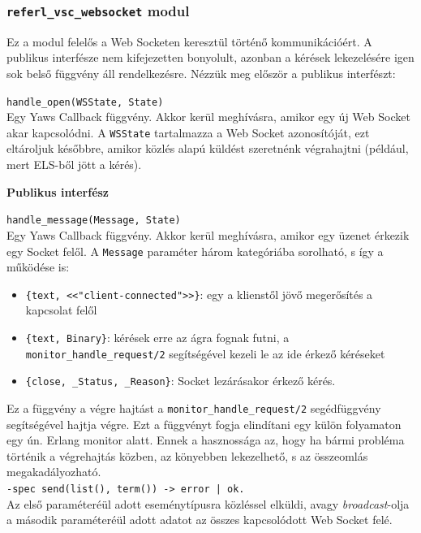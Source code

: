 \subsubsection{\lstinline{referl_vsc_websocket} modul}

Ez a modul felelős a Web Socketen keresztül történő kommunikációért. A publikus interfésze nem kifejezetten bonyolult, azonban a kérések lekezelésére igen sok belső függvény áll rendelkezésre. Nézzük meg először a publikus interfészt:

\noindent \lstinline{handle_open(WSState, State)} \\
\noindent Egy Yaws Callback függvény. Akkor kerül meghívásra, amikor egy új Web Socket akar kapcsolódni. A \lstinline{WSState} tartalmazza a Web Socket azonosítóját, ezt eltároljuk későbbre, amikor közlés alapú küldést szeretnénk végrahajtni (például, mert ELS-ből jött a kérés).

\vspace{16pt}
\noindent \textbf{Publikus interfész}

\vspace{10pt}
\noindent \lstinline{handle_message(Message, State)} \\
\noindent Egy Yaws Callback függvény. Akkor kerül meghívásra, amikor egy üzenet érkezik egy Socket felől. A \lstinline{Message} paraméter három kategóriába sorolható, s így a működése is:
\begin{itemize}
    \item \lstinline|{text, <<"client-connected">>}|: egy a klienstől jövő megerősítés a kapcsolat felől
    \item \lstinline|{text, Binary}|: kérések erre az ágra fognak futni, a \lstinline{monitor_handle_request/2} segítségével kezeli le az ide érkező kéréseket
    \item \lstinline|{close, _Status, _Reason}|: Socket lezárásakor érkező kérés.
\end{itemize}
Ez a függvény a végre hajtást a \lstinline{monitor_handle_request/2} segédfüggvény segítségével hajtja végre. Ezt a függvényt fogja elindítani egy külön folyamaton egy ún. Erlang monitor alatt. Ennek a hasznossága az, hogy ha bármi probléma történik a végrehajtás közben, az könyebben lekezelhető, s az összeomlás megakadályozható.
\\


\noindent \lstinline{-spec send(list(), term()) -> error | ok.}\\
\noindent Az első paraméteréül adott eseménytípusra közléssel elküldi, avagy \textit{broadcast}-olja a második paraméteréül adott adatot az összes kapcsolódott Web Socket felé.\\


